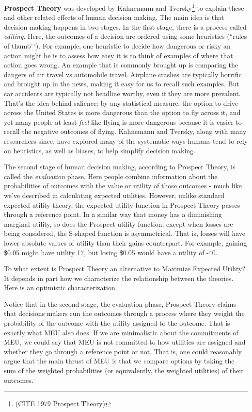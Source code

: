 \documentclass[]{tufte-book}
\begin{document}
\textbf{Prospect Theory} was developed by Kahnemann and Tversky\footnote{(CITE 1979 Prospect Theory)} to explain these and other related effects of human decision making. The main idea is that decision making happens in two stages. In the first stage, there is a process called \emph{editing}. Here, the outcomes of a decision are ordered using some heuristics (``rules of thumb'\,'). For example, one heuristic to decide how dangerous or risky an action might be is to assess how easy it is to think of examples of where that action goes wrong. An example that is commonly brought up is comparing the dangers of air travel vs automobile travel. Airplane crashes are typically horrific and brought up in the news, making it easy for us to recall such examples. But car accidents are typically not headline worthy, even if they are more prevalent. That's the idea behind salience: by any statistical measure, the option to drive across the United States is more dangerous than the option to fly across it, and yet many people at least \emph{feel} like flying is more dangerous because it is easier to recall the negative outcomes of flying. Kahnemann and Tversky, along with many researchers since, have explored many of the systematic ways humans tend to rely on heuristics, as well as biases, to help simplify decision making.

The second stage of human decision making, according to Prospect Theory, is called the \emph{evaluation} phase. Here people combine information about the probabilities of outcomes with the value or utility of those outcomes - much like we've described in calculating expected utilities. However, unlike standard expected utility theory, the expected utility function in Prospect Theory passes through a reference point. In a similar way that money has a diminishing marginal utility, so does the Prospect utility function, except when losses are being considered, the S-shaped function is asymmetrical. That is, losses will have lower absolute values of utility than their gains counterpart. For example, gaining \$0.05 might have utility 17, but losing \$0.05 would have a utility of -40.

To what extent is Prospect Theory an alternative to Maximize Expected Utility? It depends in part how we characterize the relationship between the theories. Here is an optimistic characterization.

Notice that in the second stage, the evaluation phase, Prospect Theory claims that decisions makers run the outcomes through a process where they weight the probability of the outcome with the utility assigned to the outcome. That is exactly what MEU also does. If we are minimalistic about the commitments of MEU, we could say that MEU is not committed to how utilities are assigned and whether they go through a reference point or not. That is, one could reasonably argue that the main thrust of MEU is that we compare options by taking the sum of the weighted probabilities (or equivalently, the weighted utilities) of their outcomes.
\end{document}
